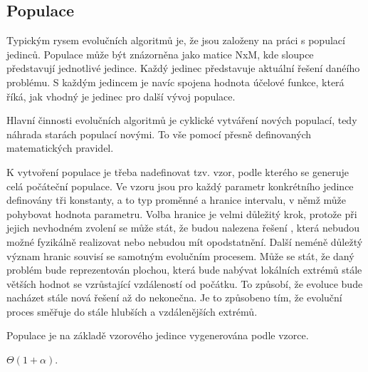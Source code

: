 \documentclass[bc,male,java,dept460]{diploma}		%
\begin{document}
\subsection{Populace}
\par Typickým rysem evolučních algoritmů je, že jsou založeny na práci s populací jedinců. Populace může být znázorněna jako matice NxM, kde sloupce představují jednotlivé jedince. Každý jedinec představuje aktuální řešení danéího problému. S každým jedincem je navíc spojena hodnota účelové funkce, která říká, jak vhodný je jedinec pro další vývoj populace.
\par Hlavní činnosti evolučních algoritmů je cyklické vytváření nových populací, tedy náhrada starách populací novými. To vše pomocí přesně definovaných matematických pravidel.
\par K vytvoření populace je třeba nadefinovat tzv. vzor, podle kterého se generuje celá počáteční populace. Ve vzoru jsou pro každý parametr konkrétního jedince definovány tři konstanty, a to typ proměnné a hranice intervalu, v němž může pohybovat hodnota parametru. Volba hranice je velmi důležitý krok, protože při jejich nevhodném zvolení se může stát, že budou nalezena řešení , která nebudou možné fyzikálně realizovat nebo nebudou mít opodstatnění. 
Další neméně důležtý význam hranic souvisí se samotným evolučním procesem. Může se stát, že daný problém bude reprezentován plochou, která bude nabývat lokálních extrémů stále větších hodnot se vzrůstající vzdáleností od počátku. To způsobí, že evoluce bude nacházet stále nová řešení až do nekonečna. Je to způsobeno tím, že evoluční proces směřuje do stále hlubších a vzdálenějších extrémů.
\par Populace je na základě vzorového jedince vygenerována podle vzorce.

$\Theta(1+\alpha)$.  
\end{document}
